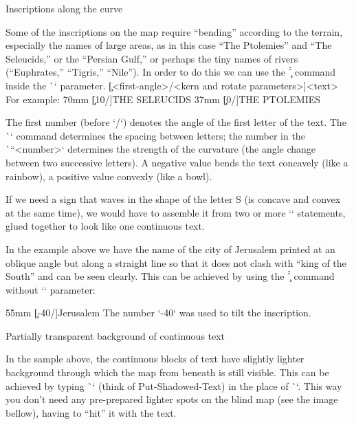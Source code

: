 {{\secc[maptitles] Inscriptions along the curve

Some of the inscriptions on the map require “bending” according to the terrain, especially the 
names of large areas, as in this case  “The Ptolemies” and “The Seleucids,” or the “Persian 
Gulf,” or perhaps the tiny names of rivers (“Euphrates,” “Tigris,” “Nile”). 
In order to do this we can use the \`\c` command inside the \`\puttext` parameter.
\begtt
\c[<first-angle>/<kern and rotate parameters>]{<text>}
\endtt
For example:
\begtt
\puttext 62mm 70mm {\c[10/\kern7pt]{THE SELEUCIDS}}
\puttext 2mm 37mm {\c[0/\kern4pt]{THE PTOLEMIES}}
\endtt

The first number (before `/`) denotes the angle of the first letter of the text.
The \`\kern` command determines the spacing between letters; the number in the \`\pdfrotate``{<number>}` 
determines the strength of the curvature (the angle change between two successive letters). A negative value bends the text concavely 
(like a rainbow), a positive value convexly (like a bowl).

If we need a sign that waves in the shape of the letter S (is concave and convex at 
the same time), we would have to assemble it from two or more `\puttext` statements, glued 
together to look like one continuous text. 


In the example above we have the name of the city of Jerusalem printed at an oblique angle but along a straight line so that it 
does not clash with “king of the South” and can be seen clearly.
This can be achieved by using the \`\c` command without `\pdfrotate` parameter:

\begtt
\puttext 48mm 55mm {\c[-40/\kern1pt]{Jerusalem}}
\endtt
The number `-40` was used to tilt the inscription.


\secc[bkgrnd] Partially transparent background of continuous text

In the sample above, the continuous blocks of text have slightly lighter background 
through which the map from beneath is still visible.
This can be achieved by typing \`\putstext` (think of Put-Shadowed-Text) in the place of 
\`\puttext`. This way you don't need any pre-prepared lighter spots on the blind map (see the 
image bellow), having to “hit” it with the text. 


\medskip
\centerline{\picw=150pt }

\smallskip

}}
